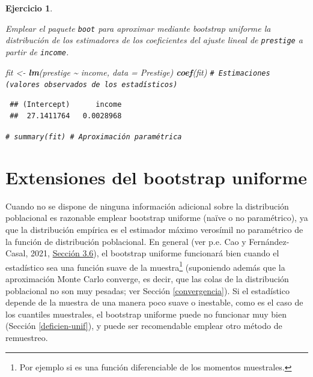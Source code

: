 \documentclass[
  spanish,
  10pt,
]{book}
\newenvironment{Shaded}{\begin{snugshade}}{\end{snugshade}}
\newcommand{\AttributeTok}[1]{\textcolor[rgb]{0.13,0.29,0.53}{#1}}
\newcommand{\CommentTok}[1]{\textcolor[rgb]{0.56,0.35,0.01}{\textit{#1}}}
\newcommand{\FunctionTok}[1]{\textcolor[rgb]{0.13,0.29,0.53}{\textbf{#1}}}
\newcommand{\NormalTok}[1]{#1}
\newcommand{\OtherTok}[1]{\textcolor[rgb]{0.56,0.35,0.01}{#1}}
\newcommand{\SpecialCharTok}[1]{\textcolor[rgb]{0.81,0.36,0.00}{\textbf{#1}}}
\theoremstyle{break}
\newtheorem{exercise}{Ejercicio}[chapter]
\theoremstyle{nonumberplain}
\renewcommand{\CommentTok}[1]{\textcolor[rgb]{0.41,0.41,0.41}{\texttt{#1}}}
\let\oldfootnote\footnote
\renewcommand\footnote[1]{\oldfootnote{\hspace{2mm}#1}}
\begin{document}
\begin{exercise}
\protect\hypertarget{exr:boot-multi}{}\label{exr:boot-multi}

Emplear el paquete \texttt{boot} para aproximar mediante bootstrap uniforme
la distribución de los estimadores de los coeficientes del ajuste
lineal de \texttt{prestige} a partir de \texttt{income}.

\begin{Shaded}
\begin{Highlighting}[]
\NormalTok{fit }\OtherTok{\textless{}{-}} \FunctionTok{lm}\NormalTok{(prestige }\SpecialCharTok{\textasciitilde{}}\NormalTok{ income, }\AttributeTok{data =}\NormalTok{ Prestige)}
\FunctionTok{coef}\NormalTok{(fit) }\CommentTok{\# Estimaciones (valores observados de los estadísticos)}
\end{Highlighting}
\end{Shaded}

\begin{verbatim}
 ## (Intercept)      income 
 ##  27.1411764   0.0028968
\end{verbatim}

\begin{Shaded}
\begin{Highlighting}[]
\CommentTok{\# summary(fit) \# Aproximación paramétrica}
\end{Highlighting}
\end{Shaded}

\end{exercise}

\chapter{Extensiones del bootstrap uniforme}\label{modunif}

Cuando no se dispone de ninguna información adicional sobre la distribución poblacional es razonable emplear bootstrap uniforme (naïve o no paramétrico), ya que la distribución empírica es el estimador máximo verosímil no paramétrico de la función de distribución poblacional.
En general (ver p.e. Cao y Fernández-Casal, 2021, \href{https://rubenfcasal.github.io/book_remuestreo/validez-de-la-aproximaci\%C3\%B3n-bootstrap.html}{Sección 3.6}), el bootstrap uniforme funcionará bien cuando el estadístico sea una función suave de la muestra\footnote{Por ejemplo si es una función diferenciable de los momentos muestrales.} (suponiendo además que la aproximación Monte Carlo converge, es decir, que las colas de la distribución poblacional no son muy pesadas; ver Sección \ref{convergencia}).
Si el estadístico depende de la muestra de una manera poco suave o inestable, como es el caso de los cuantiles muestrales, el bootstrap uniforme puede no funcionar muy bien (Sección \ref{deficien-unif}), y puede ser recomendable emplear otro método de remuestreo.
\end{document}
